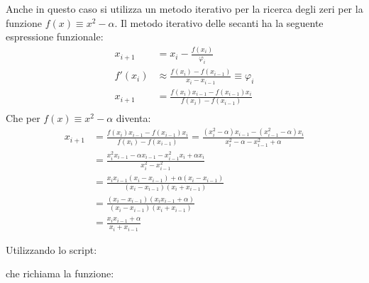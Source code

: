 \par 
Anche in questo caso si utilizza un metodo iterativo per la ricerca degli zeri per la funzione $f(x) \equiv x^2 - \alpha$. Il metodo iterativo delle secanti ha la seguente espressione funzionale:
\begin{equation*}
	\begin{split}
		x_{i+1} & = x_i-\frac{f(x_i)}{\varphi_i} \\
		f'(x_i) & \approx \frac{f(x_i) - f(x_{i-1})}{x_i - x_{i-1}} \equiv \varphi_i \\
		x_{i+1} & = \frac{f(x_i)x_{i-1}-f(x_{i-1})x_i}{f(x_i)-f(x_{i-1})} \\
	\end{split}
\end{equation*}
Che per $f(x) \equiv x^2 - \alpha$ diventa:
\begin{equation*}
	\begin{split}
		x_{i+1} & = \frac{f(x_i)x_{i-1}-f(x_{i-1})x_i}{f(x_i)-f(x_{i-1})} = \frac{(x_i^2-\alpha)x_{i-1}-(x^2_{i-1}-\alpha)x_i}{x_i^2-\alpha - x_{i-1}^2 + \alpha}\\
		& = \frac{ x_i^2x_{i-1} - \alpha x_{i-1} - x^2_{i-1}x_i + \alpha x_i }{ x_i^2 - x_{i-1}^2 } \\
		& = \frac{ x_i x_{i-1} ( x_i - x_{i-1} ) + \alpha ( x_i - x_{i-1} ) }{ ( x_i - x_{i-1} ) ( x_i + x_{i-1} ) } \\
		& = \frac{ ( x_i - x_{i-1} ) (x_i x_{i-1}  + \alpha) }{ ( x_i - x_{i-1} ) ( x_i + x_{i-1} ) } \\ 
		& = \frac{ x_i x_{i-1}  + \alpha }{ x_i + x_{i-1} }
	\end{split}
\end{equation*}

Utilizzando lo script:


che richiama la funzione:


